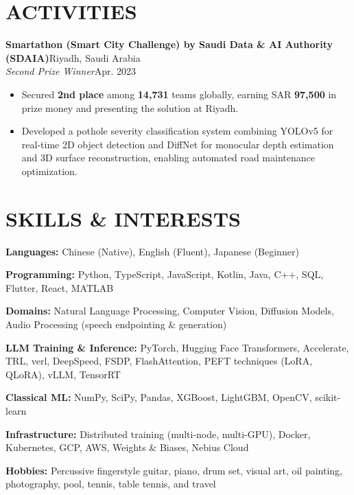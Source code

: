 \documentclass[10pt,a4paper]{article}
\newcommand{\experience}[4]{%
    \textbf{#1}\hfill #2\\
    \textit{#3}\hfill #4%
}
\begin{document}
\section{ACTIVITIES}
\experience{Smartathon (Smart City Challenge) by Saudi Data \& AI Authority (SDAIA)}{Riyadh, Saudi Arabia}
{Second Prize Winner}{Apr. 2023}
\begin{itemize}
    \item Secured \textbf{2nd place} among \textbf{14,731} teams globally, earning SAR \textbf{97,500} in prize money and presenting the solution at Riyadh.
    \item Developed a pothole severity classification system combining YOLOv5 for real-time 2D object detection and DiffNet for monocular depth estimation and 3D surface reconstruction, enabling automated road maintenance optimization.
\end{itemize}

\section{SKILLS \& INTERESTS}
\textbf{Languages:} Chinese (Native), English (Fluent), Japanese (Beginner)

\textbf{Programming:} Python, TypeScript, JavaScript, Kotlin, Java, C++, SQL, Flutter, React, MATLAB

\textbf{Domains:} Natural Language Processing, Computer Vision, Diffusion Models, Audio Processing (speech endpointing \& generation)

\textbf{LLM Training \& Inference:} PyTorch, Hugging Face Transformers, Accelerate, TRL, verl, DeepSpeed, FSDP, FlashAttention, PEFT techniques (LoRA, QLoRA), vLLM, TensorRT

\textbf{Classical ML:} NumPy, SciPy, Pandas, XGBoost, LightGBM, OpenCV, scikit-learn

\textbf{Infrastructure:} Distributed training (multi-node, multi-GPU), Docker, Kubernetes, GCP, AWS, Weights \& Biases, Nebius Cloud

\textbf{Hobbies:} Percussive fingerstyle guitar, piano, drum set, visual art, oil painting, photography, pool, tennis, table tennis, and travel
\end{document}
